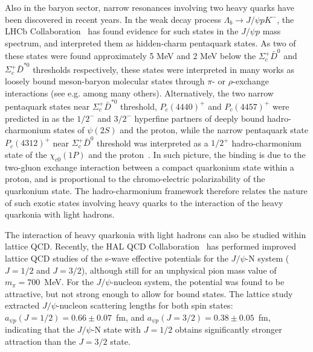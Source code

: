 \documentclass[prd,amsmath,%
twocolumn,floatfix,amssymb, preprintnumbers, linenumbers,nofootinbib, superscriptaddress]{revtex4}
\begin{document}
Also in the baryon sector, narrow resonances involving two heavy quarks have been discovered in recent years. In the weak decay process
$\Lambda_b \to J/\psi p K^-$, the LHCb Collaboration~\cite{Aaij:2015tga, Aaij:2019vzc} 
has found evidence for such states in the  
$J/\psi p$ mass spectrum, 
and interpreted them as hidden-charm pentaquark states. 
As two of these states were found approximately 5 MeV and 2 MeV below the $\Sigma_c^+ \bar D^0$ and $\Sigma_c^+ \bar D^{\ast 0}$ thresholds respectively, these states were interpreted in many works as loosely bound meson-baryon molecular states through $\pi$- or $\rho$-exchange interactions (see e.g. \cite{Roca:2015dva} among many others).  
Alternatively, the two narrow pentaquark states near $\Sigma_c^+ \bar D^{\ast 0}$ threshold, $P_c(4440)^+$ and $P_c(4457)^+$ were predicted in \cite{Eides:2015dtr} as the $1/2^-$ and $3/2^-$ hyperfine partners of deeply bound hadro-charmonium states of $\psi(2S)$ and the proton, while the narrow pentaquark state $P_c(4312)^+$ 
near $\Sigma_c^+ \bar D^0$ threshold was interpreted as a $1/2^+$ hadro-charmonium state of the $\chi_{c0}(1P)$ and the proton~\cite{Eides:2019tgv}. In such picture, the binding is due to the two-gluon exchange interaction between a compact quarkonium state within a proton, and is proportional to the chromo-electric polarizability of the quarkonium state. 
The hadro-charmonium framework therefore relates the nature of such exotic states involving heavy quarks to the interaction of the heavy quarkonia with light hadrons. 

The interaction of heavy quarkonia with light hadrons can 
also be studied within lattice QCD. 
Recently, the HAL QCD Collaboration~\cite{Sugiura:2019pye}  has performed improved lattice QCD studies of the s-wave effective potentials for 
the  $J/\psi$-N system ($J = 1/2$ and $J = 3/2$), although still for an unphysical pion mass value of $m_\pi = 700$~MeV. For the $J/\psi$-nucleon system, the potential was found to be attractive, but not strong enough to allow for bound states. The lattice study extracted $J/\psi$-nucleon scattering lengths for both spin states: 
$a_{\psi p}(J = 1/2) = 0.66 \pm 0.07$~fm, and 
$a_{\psi p}(J = 3/2) = 0.38 \pm 0.05$~fm, indicating that the $J/\psi$-N state with 
$J = 1/2$  obtains significantly stronger attraction than the $J = 3/2$ state. 
\end{document}
